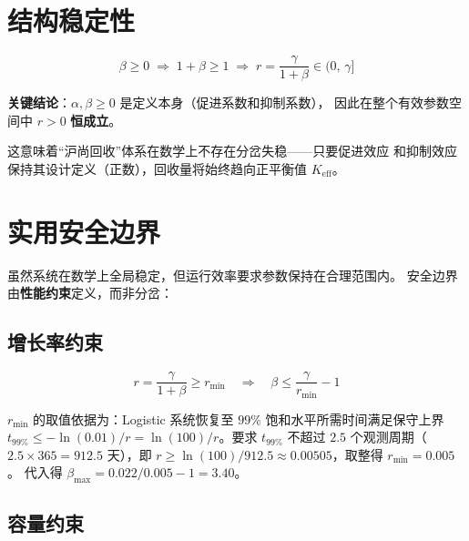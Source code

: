 \documentclass[12pt,a4paper]{article}
\begin{document}
\section{结构稳定性}

\begin{equation}
\beta \geq 0 \;\Rightarrow\; 1+\beta \geq 1 \;\Rightarrow\; r = \frac{\gamma}{1+\beta} \in (0,\, \gamma]
\end{equation}

\textbf{关键结论}：$\alpha, \beta \geq 0$ 是定义本身（促进系数和抑制系数），
因此在整个有效参数空间中 $r > 0$ \textbf{恒成立}。

\begin{center}
\end{center}

这意味着``沪尚回收''体系在数学上不存在分岔失稳——只要促进效应
和抑制效应保持其设计定义（正数），回收量将始终趋向正平衡值 $K_{\text{eff}}$。

\section{实用安全边界}

虽然系统在数学上全局稳定，但运行效率要求参数保持在合理范围内。
安全边界由\textbf{性能约束}定义，而非分岔：

\subsection{增长率约束}

\begin{equation}
r = \frac{\gamma}{1+\beta} \geq r_{\min} \quad\Rightarrow\quad
\beta \leq \frac{\gamma}{r_{\min}} - 1
\end{equation}

$r_{\min}$ 的取值依据为：Logistic 系统恢复至 $99\%$ 饱和水平所需时间满足保守上界
$t_{99\%} \leq -\ln(0.01)/r = \ln(100)/r$。要求 $t_{99\%}$ 不超过
$2.5$ 个观测周期（$2.5 \times 365 = 912.5$ 天），即
$r \geq \ln(100)/912.5 \approx 0.00505$，取整得 $r_{\min} = 0.005$。
代入得 $\beta_{\max} = 0.022/0.005 - 1 = 3.40$。

\subsection{容量约束}
\end{document}
